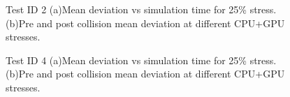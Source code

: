 \begin{figure}[h] 
  \centering
  \caption{Test ID 2 (a)Mean deviation vs simulation time for 25\% stress. (b)Pre and post collision mean deviation at different CPU+GPU stresses.}
\end{figure}

\begin{figure}[h] 
  \centering
  \caption{Test ID 4 (a)Mean deviation vs simulation time for 25\% stress. (b)Pre and post collision mean deviation at different CPU+GPU stresses.}
\end{figure}

